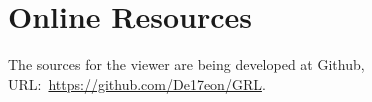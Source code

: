 \documentclass[
]{ceurart}
\begin{document}
\appendix

\section{Online Resources}

The sources for the viewer are being developed at Github, URL:~\url{https://github.com/De17eon/GRL}.
\end{document}
